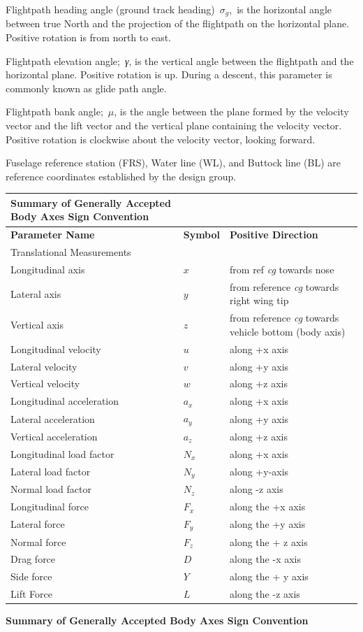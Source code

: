 \documentclass[
]{book}
\begin{document}
Flightpath heading angle (ground track heading)~\(\sigma_g\),~is the horizontal angle between true North and the projection of the flightpath on the horizontal plane. Positive rotation is from north to east.

Flightpath elevation angle;~\emph{γ}, is the vertical angle between the flightpath and the horizontal plane. Positive rotation is up. During a descent, this parameter is commonly known as glide path angle.

Flightpath bank angle;~\(\mu\), is the angle between the plane formed by the velocity vector and the lift vector and the vertical plane containing the velocity vector. Positive rotation is clockwise about the velocity vector, looking forward.

Fuselage reference station (FRS), Water line (WL), and Buttock line (BL) are reference coordinates established by the design group.

\begin{longtable}[]{@{}lll@{}}
\toprule
\textbf{Summary of Generally Accepted Body Axes Sign Convention} & &\tabularnewline
\midrule
\endhead
\textbf{Parameter Name} & \textbf{Symbol} & \textbf{Positive Direction}\tabularnewline
Translational Measurements & &\tabularnewline
Longitudinal axis & \(x\) & from ref \emph{cg} towards nose\tabularnewline
Lateral axis & \(y\) & from reference \emph{cg} towards right wing tip\tabularnewline
Vertical axis & \(z\) & from reference \emph{cg} towards vehicle bottom (body axis)\tabularnewline
Longitudinal velocity & \(u\) & along +x axis\tabularnewline
Lateral velocity & \(v\) & along +y axis\tabularnewline
Vertical velocity & \(w\) & along +z axis\tabularnewline
Longitudinal acceleration & \(a_x\) & along +x axis\tabularnewline
Lateral acceleration & \(a_y\) & along +y axis\tabularnewline
Vertical acceleration & \(a_z\) & along +z axis\tabularnewline
Longitudinal load factor & \(N_x\) & along +x axis\tabularnewline
Lateral load factor & \(N_y\) & along +y-axis\tabularnewline
Normal load factor & \(N_z\) & along -z axis\tabularnewline
Longitudinal force & \(F_x\) & along the +x axis\tabularnewline
Lateral force & \(F_y\) & along the +y axis\tabularnewline
Normal force & \(F_z\) & along the + z axis\tabularnewline
Drag force & \(D\) & along the -x axis\tabularnewline
Side force & \(Y\) & along the + y axis\tabularnewline
Lift Force & \(L\) & along the -z axis\tabularnewline
\bottomrule
\end{longtable}

\textbf{Summary of Generally Accepted Body Axes Sign Convention}
\end{document}
